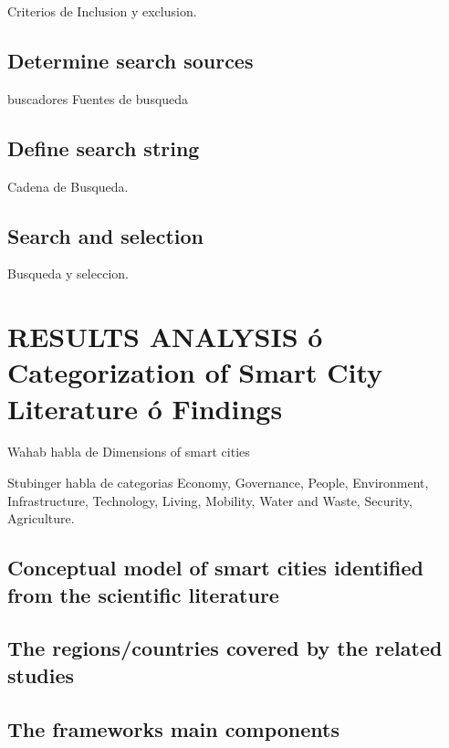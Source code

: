 \documentclass[a4paper,fleqn,spanish]{cas-dc}
\begin{document}
Criterios de Inclusion y exclusion.

\subsection{Determine search sources}\label{fuentes}

buscadores
Fuentes de busqueda


\subsection{Define search string}\label{cadena}

Cadena de Busqueda.


\subsection{Search and selection}\label{seleccion}

Busqueda y seleccion.


\section{RESULTS ANALYSIS ó Categorization of Smart City Literature ó Findings}\label{resultados}

Wahab habla de Dimensions of smart cities \cite{wahab_systematic_2020}

Stubinger habla de categorias \cite{stubinger_understanding_2020}
Economy,
Governance,
People,
Environment,
Infrastructure,
Technology,
Living,
Mobility,
Water and Waste,
Security, 
Agriculture.


\subsection{Conceptual model of smart cities identified from the scientific literature}\label{sci-lit}


\subsection{The regions/countries covered by the related studies}\label{regiones}



\subsection{The frameworks main components}\label{componentes}
\end{document}
